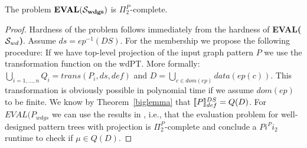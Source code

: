 \begin{corollary}
The problem	$\mathit{\mathbf{EVAL(\mathcal{S}_{wdgs})}}$ is $\Pi^P_2$-complete.
\end{corollary}
\begin{proof}
Hardness of the problem follows immediately from the hardness of 
\textbf{EVAL($\mathcal{S}_{wd}$)}.
Assume $ds = ep^{-1}(DS)$. %
For the membership we propose the following procedure:
If we have top-level projection of the input graph pattern $P$ we  use the
transformation function on the wdPT. More formally:
$\bigcup\limits_{i=1,\dots,n}Q_i = trans(P_i,ds,def)$ and $D = \bigcup\limits_{c\in dom(ep)} data(ep(c))$. This transformation is obviously
possible in polynomial time if we assume $dom(ep)$ to be finite. We know by Theorem~\ref{biglemma} that 
$\llbracket P \rrbracket^{DS}_{def} = Q(D)$.
For $\mathbf{\mathit{EVAL(P_{wdgs}}}$ we can use the results in 
\cite{letelier2013static}, i.e., that the evaluation problem for well-designed
pattern trees with projection is $\Pi^P_2$-complete and conclude a $Pi^Pi_2$ runtime to
check if $\mu \in Q(D)$. 
\end{proof}

